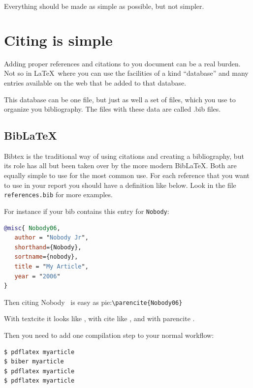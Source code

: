 \def\TheFile{ch08_citingsimple.tex}

\begin{savequote}[15cm]
  \vspace{-30mm}
  \raggedleft
\sffamily
Everything should be made as simple as possible, but not simpler.
\end{savequote}
\chapter{Citing is simple}

Adding proper references and citations to you document can be a real
burden.
Not so in \LaTeX\ where you can use the facilities of a kind ``database''
and many entries available on the web that be added to that database.

This database can be one file, but just as well a set of files, which
you use to organize you bibliography. The files with these data are
called .bib files.

\section{Bib\LaTeX}
Bibtex is the traditional way of using citations and creating a bibliography, but its role has all but been taken over by the more modern Bib\LaTeX.
Both are equally simple to use for the most common use. For each reference that you want to use in your report you should have a definition like below. Look in the file \texttt{references.bib} for more examples.

For instance if your bib contains this entry for \texttt{Nobody}:
\begin{lstlisting}[language=BibTeX]
@misc{ Nobody06,
   author = "Nobody Jr",
   shorthand={Nobody},
   sortname={nobody},
   title = "My Article",
   year = "2006"
}
\end{lstlisting}
\lstset{language=BibTeX}
Then citing Nobody~\parencite{Nobody06} is easy as
pie:\lstinline|\parencite{Nobody06}|

With textcite it looks like \textcite{Nobody06}, with cite like \cite{Nobody06}, and with parencite \parencite{Nobody06}.

Then you need to add one compilation step to your normal workflow:

\begin{lstlisting}[language=sh,morekeywords={biber}]
$ pdflatex myarticle
$ biber myarticle
$ pdflatex myarticle
$ pdflatex myarticle
\end{lstlisting}

